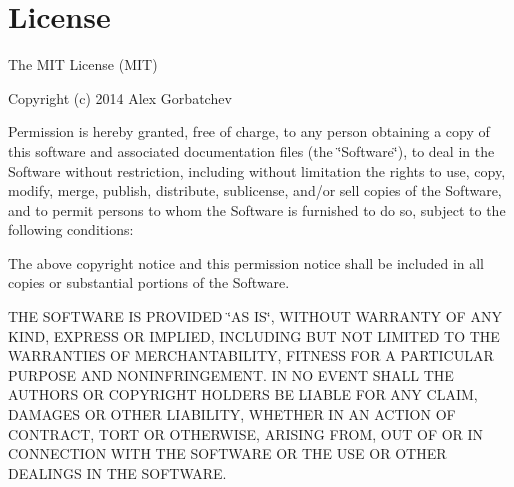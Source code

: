 \section*{License}

The M\+IT License (M\+IT)

Copyright (c) 2014 Alex Gorbatchev

Permission is hereby granted, free of charge, to any person obtaining a copy of this software and associated documentation files (the \char`\"{}\+Software\char`\"{}), to deal in the Software without restriction, including without limitation the rights to use, copy, modify, merge, publish, distribute, sublicense, and/or sell copies of the Software, and to permit persons to whom the Software is furnished to do so, subject to the following conditions\+:

The above copyright notice and this permission notice shall be included in all copies or substantial portions of the Software.

T\+HE S\+O\+F\+T\+W\+A\+RE IS P\+R\+O\+V\+I\+D\+ED \char`\"{}\+A\+S I\+S\char`\"{}, W\+I\+T\+H\+O\+UT W\+A\+R\+R\+A\+N\+TY OF A\+NY K\+I\+ND, E\+X\+P\+R\+E\+SS OR I\+M\+P\+L\+I\+ED, I\+N\+C\+L\+U\+D\+I\+NG B\+UT N\+OT L\+I\+M\+I\+T\+ED TO T\+HE W\+A\+R\+R\+A\+N\+T\+I\+ES OF M\+E\+R\+C\+H\+A\+N\+T\+A\+B\+I\+L\+I\+TY, F\+I\+T\+N\+E\+SS F\+OR A P\+A\+R\+T\+I\+C\+U\+L\+AR P\+U\+R\+P\+O\+SE A\+ND N\+O\+N\+I\+N\+F\+R\+I\+N\+G\+E\+M\+E\+NT. IN NO E\+V\+E\+NT S\+H\+A\+LL T\+HE A\+U\+T\+H\+O\+RS OR C\+O\+P\+Y\+R\+I\+G\+HT H\+O\+L\+D\+E\+RS BE L\+I\+A\+B\+LE F\+OR A\+NY C\+L\+A\+IM, D\+A\+M\+A\+G\+ES OR O\+T\+H\+ER L\+I\+A\+B\+I\+L\+I\+TY, W\+H\+E\+T\+H\+ER IN AN A\+C\+T\+I\+ON OF C\+O\+N\+T\+R\+A\+CT, T\+O\+RT OR O\+T\+H\+E\+R\+W\+I\+SE, A\+R\+I\+S\+I\+NG F\+R\+OM, O\+UT OF OR IN C\+O\+N\+N\+E\+C\+T\+I\+ON W\+I\+TH T\+HE S\+O\+F\+T\+W\+A\+RE OR T\+HE U\+SE OR O\+T\+H\+ER D\+E\+A\+L\+I\+N\+GS IN T\+HE S\+O\+F\+T\+W\+A\+RE. 